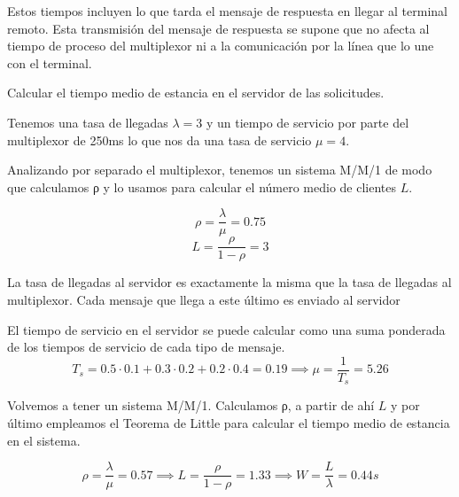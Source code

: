 \begin{problem}[8]
Estos tiempos incluyen lo que tarda el mensaje de respuesta en llegar al terminal remoto. Esta transmisión del mensaje de respuesta se supone que no afecta al tiempo de proceso del multiplexor ni a la comunicación por la línea que lo une con el terminal.

Calcular el tiempo medio de estancia en el servidor de las solicitudes.



\solution

\yoP


\spart

Tenemos una tasa de llegadas $λ=3$ y un tiempo de servicio por parte del multiplexor de 250ms lo que nos da una tasa de servicio $μ=4$.

Analizando por separado el multiplexor, tenemos un sistema M/M/1 de modo que calculamos ρ y lo usamos para calcular el número medio de clientes $L$.

\[ρ=\frac{λ}{μ}=0.75\]
\[L=\frac{ρ}{1-ρ}=3\]

\spart

La tasa de llegadas al servidor es exactamente la misma que la tasa de llegadas al multiplexor. Cada mensaje que llega a este último es enviado al servidor

\spart

El tiempo de servicio en el servidor se puede calcular como una suma ponderada de los tiempos de servicio de cada tipo de mensaje.
\[T_s = 0.5\cdot 0.1+0.3\cdot 0.2+0.2\cdot 0.4=0.19 \implies μ = \frac{1}{T_s}=5.26\]

Volvemos a tener un sistema M/M/1. Calculamos ρ, a partir de ahí $L$ y por último empleamos el Teorema de Little para calcular el tiempo medio de estancia en el sistema.

\[ρ = \frac{λ}{μ}=0.57 \implies L=\frac{ρ}{1-ρ}=1.33 \implies W = \frac{L}{λ}=0.44 s\]

\end{problem}


